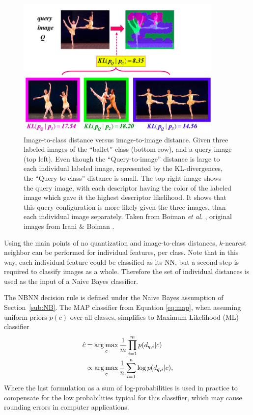 \begin{figure}[hbt]
    \centering
    \includegraphics[width=0.9\textwidth]{Im2imVsIm2cl}
    \caption{Image-to-class distance versus image-to-image distance. Given three labeled images of the ``ballet''-class (bottom row), and a query image (top left). Even though the ``Query-to-image'' distance is large to each individual labeled image, represented by the KL-divergences, the ``Query-to-class'' distance is small. The top right image shows the query image, with each descriptor having the color of the labeled image which gave it the highest descriptor likelihood. It shows that this query configuration is more likely given the three images, than each individual image separately. Taken from Boiman \emph{et al.} \cite{boiman2008defense}, original images from Irani \& Boiman \cite{irani2006similarity}.}
    \label{fig:im2im_vs_im2cl}
\end{figure}

Using the main points of no quantization and image-to-class distances, $k$-nearest neighbor can be performed for individual features, per class. Note that in this way, each individual feature could be classified as its NN, but a second step is required to classify images as a whole. Therefore the set of individual distances is used as the input of a Naive Bayes classifier.

The NBNN decision rule is defined under the Naive Bayes assumption of Section~\ref{sub:NB}. The MAP classifier from Equation \eqref{eq:map}, when assuming uniform priors $p(c)$ over all classes, simplifies to Maximum Likelihood (ML) classifier 
\begin{align}
    \hat c &= \operatorname*{arg\,max}_c \frac{1}{m}\prod_{i=1}^{m} p(d_{q,i}|c)\\
           &\propto \operatorname*{arg\,max}_c \frac{1}{n}\sum_{i=1}^{n} \log p(d_{q,i}|c),
\end{align}
Where the last formulation as a sum of log-probabilities is used in practice to compensate for the low probabilities typical for this classifier, which may cause rounding errors in computer applications.

